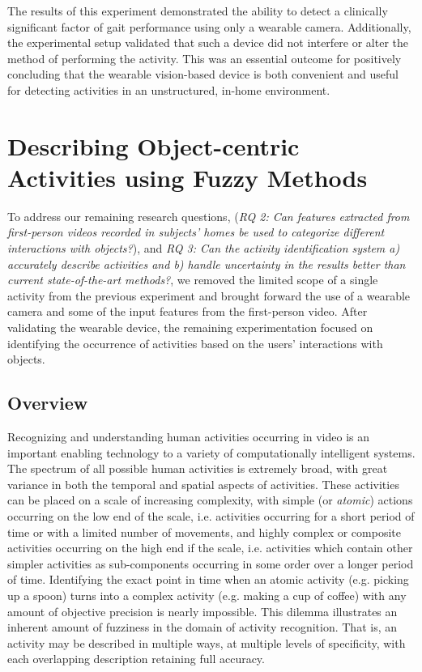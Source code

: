 \documentclass[12pt]{report}
\begin{document}
The results of this experiment demonstrated the ability to detect a clinically significant factor of gait performance using only a wearable camera. Additionally, the experimental setup validated that such a device did not interfere or alter the method of performing the activity. This was an essential outcome for positively concluding that the wearable vision-based device is both convenient and useful for detecting activities in an unstructured, in-home environment.

\section{Describing Object-centric Activities using Fuzzy Methods}
To address our remaining research questions, (\emph{RQ 2: Can features extracted from first-person videos recorded in subjects’ homes be used to categorize different interactions with objects?}), and \emph{RQ 3: Can the activity identification system a) accurately describe activities and b) handle uncertainty in the results better than current state-of-the-art methods?}, we removed the limited scope of a single activity from the previous experiment and brought forward the use of a wearable camera and some of the input features from the first-person video. After validating the wearable device, the remaining experimentation focused on identifying the occurrence of activities based on the users' interactions with objects.

\subsection{Overview}
Recognizing and understanding human activities occurring in video is an important enabling technology to a variety of computationally intelligent systems. The spectrum of all possible human activities is extremely broad, with great variance in both the temporal and spatial aspects of activities. These activities can be placed on a scale of increasing complexity, with simple (or \textit{atomic}) actions occurring on the low end of the scale, i.e. activities occurring for a short period of time or with a limited number of movements, and highly complex or composite activities occurring on the high end if the scale, i.e. activities which contain other simpler activities as sub-components occurring in some order over a longer period of time. Identifying the exact point in time when an atomic activity (e.g. picking up a spoon) turns into a complex activity (e.g. making a cup of coffee) with any amount of objective precision is nearly impossible. This dilemma illustrates an inherent amount of fuzziness in the domain of activity recognition. That is, an activity may be described in multiple ways, at multiple levels of specificity, with each overlapping description retaining full accuracy.
\end{document}
